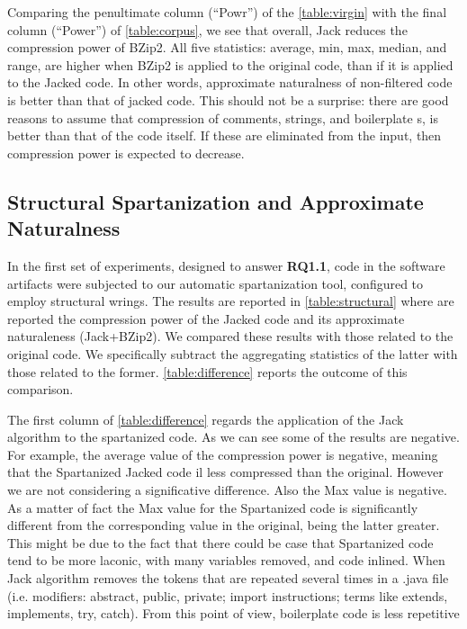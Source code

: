 Comparing the penultimate column (``Powr'') of the \cref{table:virgin} 
with the final column (``Power'') of
\cref{table:corpus}, we see that overall, Jack reduces the compression power of
BZip2. All five statistics: average, min, max, median, and range, are higher
when BZip2 is applied to the original code, than if it is applied to the Jacked
code. In other words, approximate naturalness of non-filtered code is better
than that of jacked code. This should not be a surprise: there are good reasons
to assume that compression of comments, strings, and boilerplate s,
is better than that of the code itself. If these are eliminated from the input,
then compression power is expected to decrease.

\subsection{Structural Spartanization and Approximate Naturalness}

In the first set of experiments, designed to answer \textbf{RQ1.1}, \Java code
in the software artifacts were subjected to our automatic spartanization
tool, configured to employ structural wrings. 
The results are reported in \cref{table:structural} where are reported 
the compression power of the Jacked code and its approximate 
naturaleness (Jack+BZip2). 
We compared these results %
with those related to the original code.
We specifically subtract the aggregating statistics of the latter with those related to the former.
\cref{table:difference} reports the outcome of this comparison. 

The first column of \cref{table:difference} regards the application of the Jack algorithm to the spartanized code. 
As we can see some of the results are negative.
For example, the average value of the compression power is negative, meaning that the Spartanized Jacked code 
il less compressed than the original.
However we are not considering a significative difference.
Also the Max value is negative. As a matter of fact the Max value for the Spartanized code is 
significantly different from the corresponding value in the original, being the latter greater.
This might be due to the fact that there could be case that Spartanized code 
tend to be more laconic, with many variables removed, and code inlined. 
When Jack algorithm removes the tokens that are repeated several times in a .java file 
(i.e. modifiers: abstract, public, private; import
instructions; terms like extends, implements, try, catch).
From this point of view, boilerplate code is less repetitive

